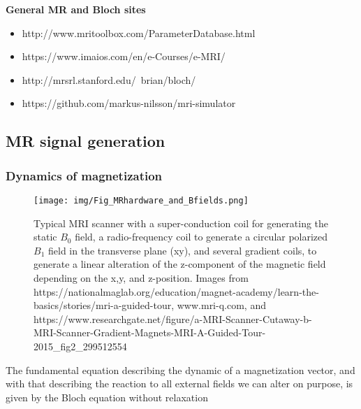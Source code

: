 \documentclass[a4paper,12pt]{extarticle}
\begin{document}
\textbf{General MR and Bloch sites}
\begin{itemize}
\item http://www.mritoolbox.com/ParameterDatabase.html
\item https://www.imaios.com/en/e-Courses/e-MRI/
\item http://mrsrl.stanford.edu/~brian/bloch/

\item https://github.com/markus-nilsson/mri-simulator
\end{itemize}


 \subsection{MR signal generation}
 \subsubsection{Dynamics of magnetization}
 
 \begin{figure}[!ht] 
\centering
\texttt{[image: img/Fig\_MRhardware\_and\_Bfields.png]}
\caption{Typical MRI scanner with a super-conduction coil for generating the static $B_0$ field, a radio-frequency coil to generate a  circular polarized $B_1$ field in the transverse plane (xy), and several gradient coils, to generate a linear alteration of the z-component of the magnetic field depending on the x,y, and z-position. Images from https://nationalmaglab.org/education/magnet-academy/learn-the-basics/stories/mri-a-guided-tour, www.mri-q.com, and 
https://www.researchgate.net/figure/a-MRI-Scanner-Cutaway-b-MRI-Scanner-Gradient-Magnets-MRI-A-Guided-Tour-2015\_fig2\_299512554
}\label{fig:MRhardware}
\end{figure}
 The fundamental equation describing the dynamic of a magnetization vector, and with that describing the reaction to all external fields we can alter on purpose, is given by the Bloch equation without relaxation
 
\end{document}
